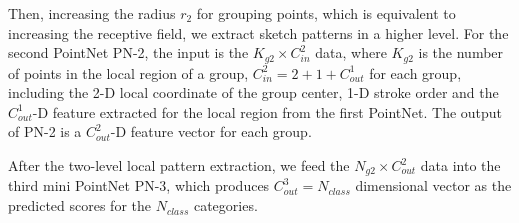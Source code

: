 Then, increasing the radius $r_2$ for grouping points, which is equivalent to increasing the receptive field, we extract sketch patterns in a higher level.
%
For the second PointNet PN-2, the input is the $K_{g2} \times C^2_{in}$ data, where $K_{g2}$ is the number of points in the local region of a group, $C^2_{in}=2+1+C^1_{out}$ for each group, including the 2-D local coordinate of the group center, 1-D stroke order and the $C^1_{out}$-D feature extracted for the local region from the first PointNet.
%
The output of PN-2 is a $C^2_{out}$-D feature vector for each group.

\vspace{0.1cm}
After the two-level local pattern extraction, we feed the $N_{g2} \times C^2_{out}$ data into the third mini PointNet PN-3, which produces $C^{3}_{out}=N_{class}$ dimensional vector as the predicted scores for the $N_{class}$ categories.




